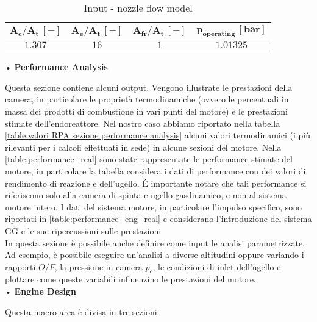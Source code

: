 \begin{itemize}
\begin{table}[H]
\centering
\begin{tabular}{|c|c|c|c|}
\hline
$\bm{A_c / A_t \, [-]}$ & $\bm{A_e / A_t \, [-]}$ & $\bm{A_{fr}/A_{t} \, [-]}$ & $\bm{p_{operating} \, [bar]}$  \\
\hline
$1.307$ & $16$ & $1$ & $1.01325$ \\
\hline
\end{tabular}
\caption{Input - nozzle flow model}
\label{table:nozzle_model}
\end{table}
\end{itemize}

• \textbf{Performance Analysis}

Questa sezione contiene alcuni output. Vengono illustrate le prestazioni della camera, in particolare le proprietà termodinamiche (ovvero le percentuali in massa dei prodotti di combustione in vari punti del motore) e le prestazioni stimate dell'endoreattore. Nel nostro caso abbiamo riportato nella tabella \autoref{table:valori RPA sezione performance analysis} alcuni valori termodinamici (i più rilevanti per i calcoli effettuati in sede) in alcune sezioni del motore. Nella \autoref{table:performance_real} sono state rappresentate le performance stimate del motore, in particolare la tabella considera i dati di performance con dei valori di rendimento di reazione e dell'ugello. \'E importante notare che tali performance si riferiscono solo alla camera di spinta e ugello gasdinamico, e non al sistema motore intero. I dati del sistema motore, in particolare l'impulso specifico, sono riportati in \autoref{table:performance_eng_real} e considerano l'introduzione del sistema GG e le sue ripercussioni sulle prestazioni \\
In questa sezione è possibile anche  definire come input le analisi parametrizzate. Ad esempio, è possibile eseguire un'analisi a diverse altitudini oppure variando i rapporti $O/F$, la pressione in camera $p_c$, le condizioni di inlet dell'ugello e plottare come queste variabili influenzino le prestazioni del motore.
\\
• \textbf{Engine Design}

Questa macro-area è divisa in tre sezioni: 

